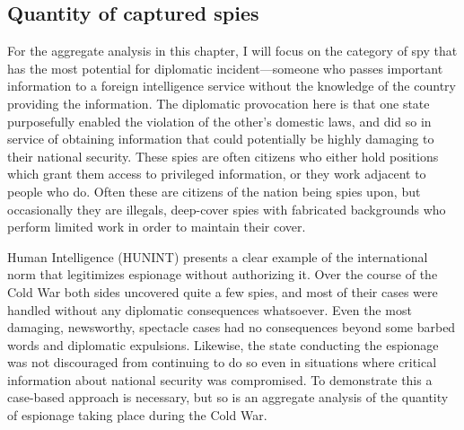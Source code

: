 \documentclass[11pt]{memoir}
\begin{document}
\begin{refsegment}
\subsection{Quantity of captured spies}
For the aggregate analysis in this chapter, I will focus on the category of spy that has the most potential for diplomatic incident---someone who passes important information to a foreign intelligence service without the knowledge of the country providing the information. The diplomatic provocation here is that one state purposefully enabled the violation of the other's domestic laws, and did so in service of obtaining information that could potentially be highly damaging to their national security. These spies are often citizens who either hold positions which grant them access to privileged information, or they work adjacent to people who do. Often these are citizens of the nation being spies upon, but occasionally they are illegals, deep-cover spies with fabricated backgrounds who perform limited work in order to maintain their cover.

Human Intelligence (HUNINT) presents a clear example of the international norm that legitimizes espionage without authorizing it. Over the course of the Cold War both sides uncovered quite a few spies, and most of their cases were handled without any diplomatic consequences whatsoever. Even the most damaging, newsworthy, spectacle cases had no consequences beyond some barbed words and diplomatic expulsions. Likewise, the state conducting the espionage was not discouraged from continuing to do so even in situations where critical information about national security was compromised. To demonstrate this a case-based approach is necessary, but so is an aggregate analysis of the quantity of espionage taking place during the Cold War.



\end{refsegment}
\end{document}
